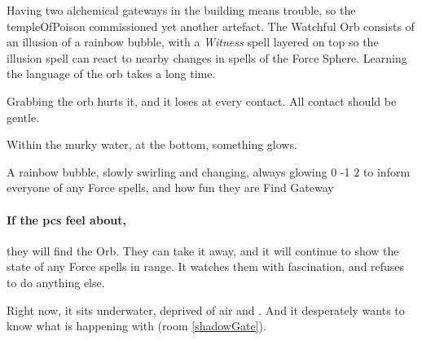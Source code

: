 \begin{multicols}{2}
\showStdSpells[
  \setcounter{diceNo}{0}
]

\null


\begin{exampletext}
  Having two alchemical gateways in the building means trouble, so the \gls{templeOfPoison} commissioned yet another \gls{artefact}.
  The Watchful Orb consists of an illusion of a rainbow bubble, with a \textit{Witness} spell layered on top so the illusion spell can react to nearby changes in spells of the Force Sphere.
  Learning the language of the orb takes a long time.

  Grabbing the orb hurts it, and it loses  at every contact.
  All contact should be gentle.
\end{exampletext}

\begin{boxtext}
  Within the murky water, at the bottom, something glows.
\end{boxtext}

  {A rainbow bubble, slowly swirling and changing, always glowing}%
  {0}%
  {-1}%
  {2}%
  {to inform everyone of any Force spells, and how fun they are}%
  {Find Gateway}%
  {
    \setcounter{Air}{3}
    \setcounter{Fire}{3}
    \setcounter{Earth}{1}
    \setcounter{Academics}{2}
    \setcounter{Xenomology}{2}
  }%

\showStdSpells[
  \setcounter{enc}{2}
  \findGatewaySpell
]

\paragraph{If the \glspl{pc} feel about,}
they will find the Orb.
They can take it away, and it will continue to show the state of any Force spells in range.
It watches them with fascination, and refuses to do anything else.

Right now, it sits underwater, deprived of air and .
And it desperately wants to know what is happening with  (room \vref{shadowGate}).




\end{multicols}
